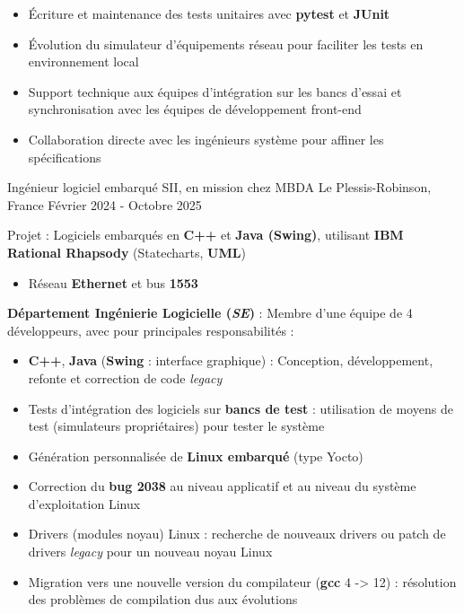 \begin{cventries}
{\begin{cvitems}
\begin{itemize}
				\item Écriture et maintenance des tests unitaires avec \textbf{pytest} et \textbf{JUnit}
				\item Évolution du simulateur d'équipements réseau pour faciliter les tests en environnement local
				\item Support technique aux équipes d'intégration sur les bancs d'essai et synchronisation avec les équipes de développement front-end
				\item Collaboration directe avec les ingénieurs système pour affiner les spécifications
			\end{itemize}
		\end{cvitems}
	}

	\cventry
	{Ingénieur logiciel embarqué} %
	{SII, en mission chez MBDA} %
	{Le Plessis-Robinson, France} %
	{Février 2024 - Octobre 2025} %
	{
		\begin{cvitems} %
		\item{
			Projet : Logiciels embarqués en \textbf{C++} et \textbf{Java (Swing)}, utilisant \textbf{IBM Rational Rhapsody} (Statecharts, \textbf{UML})
			\begin{itemize}
					\item{Réseau \textbf{Ethernet} et bus \textbf{1553}}
			\end{itemize}
		}
		\item{
			\textbf{Département Ingénierie Logicielle (\emph{SE})} : Membre d'une équipe de 4 développeurs, avec pour principales responsabilités :
			\begin{itemize}
				\item{\textbf{C++}, \textbf{Java} (\textbf{Swing} : interface graphique) : Conception, développement, refonte et correction de code \emph{legacy}}
				\item{Tests d'intégration des logiciels sur \textbf{bancs de test} : utilisation de moyens de test (simulateurs propriétaires) pour tester le système}
				\item{Génération personnalisée de \textbf{Linux embarqué} (type Yocto)}
				\item{Correction du \textbf{bug 2038} au niveau applicatif et au niveau du système d'exploitation Linux}
				\item{Drivers (modules noyau) Linux : recherche de nouveaux drivers ou patch de drivers \emph{legacy} pour un nouveau noyau Linux}
				\item{Migration vers une nouvelle version du compilateur (\textbf{gcc} 4 -> 12) : résolution des problèmes de compilation dus aux évolutions}

\end{itemize}}
\end{cvitems}}
\end{cventries}
